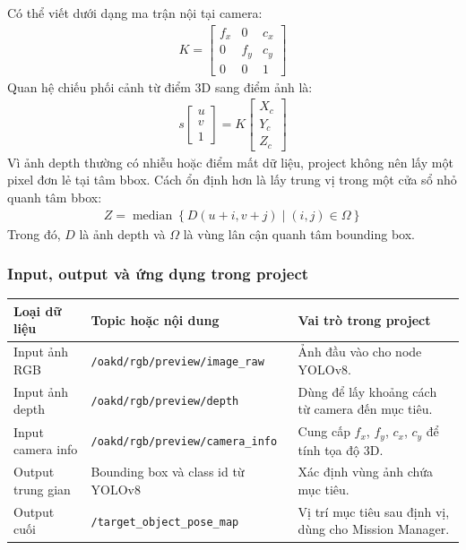 Có thể viết dưới dạng ma trận nội tại camera:
\begin{gather*}K = \begin{bmatrix}
f_{x} & 0 & c_{x} \\
0 & f_{y} & c_{y} \\
0 & 0 & 1
\end{bmatrix}\end{gather*}
Quan hệ chiếu phối cảnh từ điểm 3D sang điểm ảnh là:
\begin{gather*}s\begin{bmatrix}
u \\
v \\
1
\end{bmatrix} = K\begin{bmatrix}
X_{c} \\
Y_{c} \\
Z_{c}
\end{bmatrix}\end{gather*}
Vì ảnh depth thường có nhiễu hoặc điểm mất dữ liệu, project không nên
lấy một pixel đơn lẻ tại tâm bbox. Cách ổn định hơn là lấy trung vị
trong một cửa sổ nhỏ quanh tâm bbox:
\begin{gather*}Z = \operatorname{median}\left\{ D(u + i,v + j) \mid (i,j) \in \Omega \right\}\end{gather*}
Trong đó, \(D\) là ảnh depth và \(\Omega\) là vùng lân cận quanh tâm
bounding box.

\subsubsection{Input, output và ứng dụng trong project}

\renewcommand{\arraystretch}{1.25}
\begin{longtable}{|
  >{\raggedright\arraybackslash}p{}|
  >{\raggedright\arraybackslash}p{}|
  >{\raggedright\arraybackslash}p{}|}
\hline
\textbf{Loại dữ liệu} & \textbf{Topic hoặc nội dung} & \textbf{Vai trò trong project} \\ \hline
\hline
\endhead
\hline
\endlastfoot
Input ảnh RGB & \texttt{/oakd/rgb/}\allowbreak\texttt{preview/}\allowbreak\texttt{image\_raw} & Ảnh đầu vào cho
node YOLOv8. \\ \hline
Input ảnh depth & \texttt{/oakd/rgb/}\allowbreak\texttt{preview/}\allowbreak\texttt{depth} & Dùng để lấy khoảng
cách từ camera đến mục tiêu. \\ \hline
Input camera info & \texttt{/oakd/rgb/}\allowbreak\texttt{preview/}\allowbreak\texttt{camera\_info} & Cung cấp
\(f_{x}\), \(f_{y}\), \(c_{x}\), \(c_{y}\) để tính tọa độ 3D. \\ \hline
Output trung gian & Bounding box và class id từ YOLOv8 & Xác định vùng
ảnh chứa mục tiêu. \\ \hline
Output cuối & \texttt{/target\_}\allowbreak\texttt{object\_}\allowbreak\texttt{pose\_map} & Vị trí mục tiêu sau
định vị, dùng cho Mission Manager. \\ \hline
\end{longtable}

